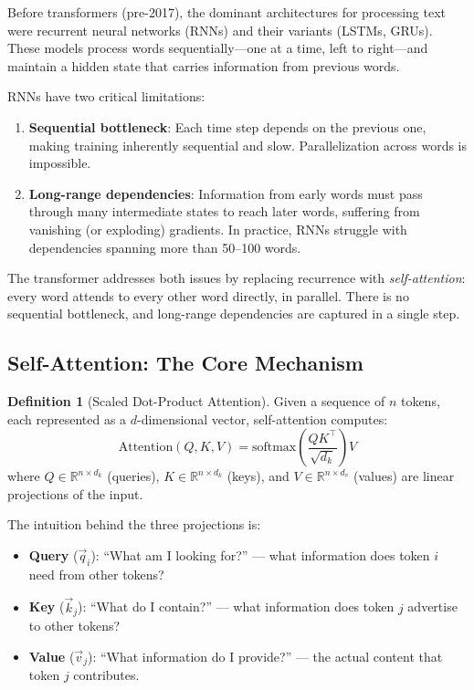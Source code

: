 \documentclass[11pt,a4paper]{article}
\theoremstyle{definition}
\newtheorem{definition}{Definition}[section]
\theoremstyle{plain}
\begin{document}
Before transformers (pre-2017), the dominant architectures for processing text were recurrent neural networks (RNNs) and their variants (LSTMs, GRUs). These models process words sequentially---one at a time, left to right---and maintain a hidden state that carries information from previous words.

RNNs have two critical limitations:
\begin{enumerate}
    \item \textbf{Sequential bottleneck}: Each time step depends on the previous one, making training inherently sequential and slow. Parallelization across words is impossible.
    \item \textbf{Long-range dependencies}: Information from early words must pass through many intermediate states to reach later words, suffering from vanishing (or exploding) gradients. In practice, RNNs struggle with dependencies spanning more than 50--100 words.
\end{enumerate}

The transformer addresses both issues by replacing recurrence with \emph{self-attention}: every word attends to every other word directly, in parallel. There is no sequential bottleneck, and long-range dependencies are captured in a single step.

\subsection{Self-Attention: The Core Mechanism}

\begin{definition}[Scaled Dot-Product Attention]
Given a sequence of $n$ tokens, each represented as a $d$-dimensional vector, self-attention computes:
\begin{equation}
\text{Attention}(Q, K, V) = \text{softmax}\!\left(\frac{QK^\top}{\sqrt{d_k}}\right) V
\label{eq:attention}
\end{equation}
where $Q \in \mathbb{R}^{n \times d_k}$ (queries), $K \in \mathbb{R}^{n \times d_k}$ (keys), and $V \in \mathbb{R}^{n \times d_v}$ (values) are linear projections of the input.
\end{definition}

The intuition behind the three projections is:
\begin{itemize}
    \item \textbf{Query} ($\vec{q}_i$): ``What am I looking for?'' --- what information does token $i$ need from other tokens?
    \item \textbf{Key} ($\vec{k}_j$): ``What do I contain?'' --- what information does token $j$ advertise to other tokens?
    \item \textbf{Value} ($\vec{v}_j$): ``What information do I provide?'' --- the actual content that token $j$ contributes.
\end{itemize}
\end{document}
